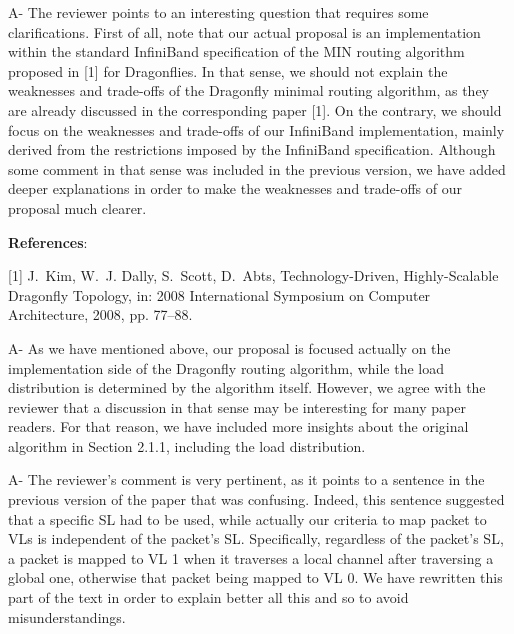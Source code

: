 \documentclass[a4paper,10pt]{letter}
\newcommand{\dflys}{Dragonflies}
\newcommand{\dfly}{Dragonfly}
\newcommand{\iba}{InfiniBand}
\begin{document}
\begin{letter}

A- The reviewer points to an interesting question that requires some clarifications. First of all, note that our actual proposal is an implementation within the standard \iba{} specification of the MIN routing algorithm proposed in [1] for \dflys{}.
In that sense, we should not explain the weaknesses and trade-offs of the \dfly{} minimal routing algorithm, as they are already discussed in the corresponding paper [1]. On the contrary, we should focus on the weaknesses and trade-offs of our \iba{} implementation, mainly derived from the restrictions imposed by the \iba{} specification. Although some comment in that sense was included in the previous version, we have added deeper explanations in order to make the weaknesses and trade-offs of our proposal much clearer.

\textbf{References}:

[1]
J.~Kim, W.~J. Dally, S.~Scott, D.~Abts, Technology-{Driven},
{Highly}-{Scalable} {Dragonfly} {Topology}, in: 2008 {International}
{Symposium} on {Computer} {Architecture}, 2008, pp. 77--88.
  



A- As we have mentioned above, our proposal is focused actually on the implementation side of the \dfly{} routing algorithm, while the load distribution is determined by the algorithm itself.
However, we agree with the reviewer that a discussion in that sense may be interesting for many paper readers.
For that reason, we have included more insights about the original algorithm in Section 2.1.1, including the load distribution.


A- The reviewer's comment is very pertinent, as it points to a sentence in the previous version of the paper that was confusing. Indeed, this sentence suggested that a specific SL had to be used, while actually our criteria to map packet to VLs is independent of the packet's SL.
Specifically, regardless of the packet's SL, a packet is mapped to VL 1 when it traverses a local channel after traversing a global one, otherwise that packet being mapped to VL 0.
We have rewritten this part of the text in order to explain better all this and so to avoid misunderstandings.


\end{letter}
\end{document}
